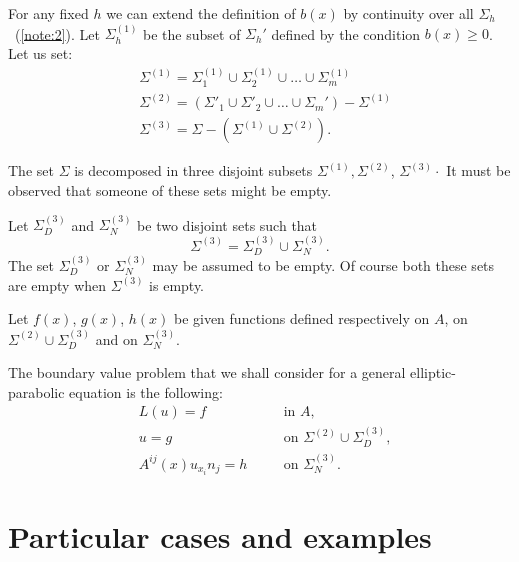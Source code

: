 \documentclass[a4paper,12pt,leqno]{article}
\numberwithin{equation}{section}
\begin{document}
For any fixed $h$ we can extend the definition of $b(x)$ by continuity over all $\Sigma_{h}$~(\ref{note:2}). 
Let $\Sigma_{h}^{(1)}$ be the subset of $\Sigma_{h}'$ defined by the condition $b(x) \geq 0$.
Let us set:
\begin{equation*}
	\begin{aligned}
		&\Sigma^{(1)}=\Sigma_{1}^{(1)} \cup \Sigma_{2}^{(1)} \cup \ldots \cup \Sigma_{m}^{(1)} \\
		&\Sigma^{(2)}=\left(\Sigma'_{1} \cup \Sigma'_{2} \cup \ldots \cup \Sigma_{m}'\right)-\Sigma^{(1)} \\
		&\Sigma^{(3)}=\Sigma-\left(\Sigma^{(1)} \cup \Sigma^{(2)}\right) .
	\end{aligned}
\end{equation*}

The set $\Sigma$ is decomposed in three disjoint subsets $\Sigma^{(1)}, \Sigma^{(2)}$, $\Sigma^{(3)} \cdot$ It must be observed that someone of these sets might be empty.

Let $\Sigma_{D}^{(3)}$ and $\Sigma_{N}^{(3)}$ be two disjoint sets such that
\begin{equation*}
	\Sigma^{(3)}=\Sigma_{D}^{(3)} \cup \Sigma_{N}^{(3)}.
\end{equation*}
The set $\Sigma_{D}^{(3)}$ or $\Sigma_{N}^{(3)}$ may be assumed to be empty. 
Of course both these sets are empty when $\Sigma^{(3)}$ is empty.

Let $f(x)$, $g(x)$, $h(x)$ be given functions defined respectively on $A$, on $\Sigma^{(2)} \cup \Sigma_{D}^{(3)}$ and on $\Sigma_{N}^{(3)}$.

The boundary value problem that we shall consider for a general elliptic-parabolic equation is the following:
\begin{equation} \label{eq:1.1}
	\boxed{
	\begin{aligned}
		&L(u)=f && \quad \text{in } A,\\
		&u=g && \quad \text{on } \Sigma^{(2)}\cup\Sigma_D^{(3)},\\
		&A^{i j}(x) u_{x_{i}} n_{j}=h && \quad \text{on } \Sigma_N^{(3)}.
	\end{aligned}
	}
\end{equation}

\section{Particular cases and examples}
\label{sec:2}
\end{document}
